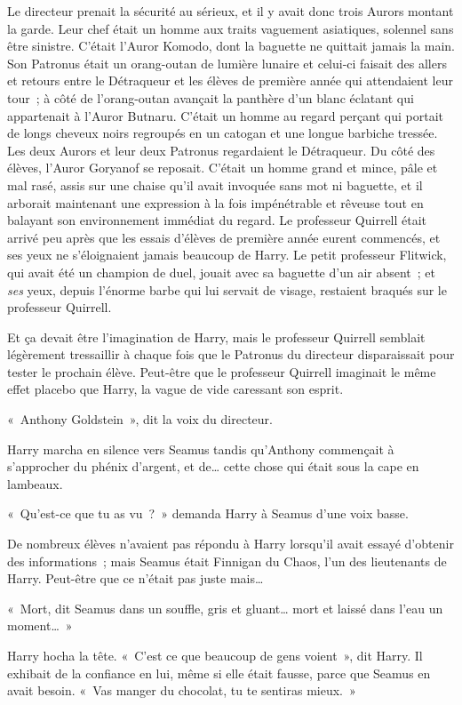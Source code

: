 Le directeur prenait la sécurité au sérieux, et il y avait donc trois Aurors montant la garde. Leur chef était un homme aux traits vaguement asiatiques, solennel sans être sinistre. C'était l'Auror Komodo, dont la baguette ne quittait jamais la main. Son Patronus était un orang-outan de lumière lunaire et celui-ci faisait des allers et retours entre le Détraqueur et les élèves de première année qui attendaient leur tour~; à côté de l'orang-outan avançait la panthère d'un blanc éclatant qui appartenait à l'Auror Butnaru. C'était un homme au regard perçant qui portait de longs cheveux noirs regroupés en un catogan et une longue barbiche tressée. Les deux Aurors et leur deux Patronus regardaient le Détraqueur. Du côté des élèves, l'Auror Goryanof se reposait. C'était un homme grand et mince, pâle et mal rasé, assis sur une chaise qu'il avait invoquée sans mot ni baguette, et il arborait maintenant une expression à la fois impénétrable et rêveuse tout en balayant son environnement immédiat du regard. Le professeur Quirrell était arrivé peu après que les essais d'élèves de première année eurent commencés, et ses yeux ne s'éloignaient jamais beaucoup de Harry. Le petit professeur Flitwick, qui avait été un champion de duel, jouait avec sa baguette d'un air absent~; et \emph{ses} yeux, depuis l'énorme barbe qui lui servait de visage, restaient braqués sur le professeur Quirrell.

Et ça devait être l'imagination de Harry, mais le professeur Quirrell semblait légèrement tressaillir à chaque fois que le Patronus du directeur disparaissait pour tester le prochain élève. Peut-être que le professeur Quirrell imaginait le même effet placebo que Harry, la vague de vide caressant son esprit.

«~Anthony Goldstein~», dit la voix du directeur.

Harry marcha en silence vers Seamus tandis qu'Anthony commençait à s'approcher du phénix d'argent, et de… cette chose qui était sous la cape en lambeaux.

«~Qu'est-ce que tu as vu~?~» demanda Harry à Seamus d'une voix basse.

De nombreux élèves n'avaient pas répondu à Harry lorsqu'il avait essayé d'obtenir des informations~; mais Seamus était Finnigan du Chaos, l'un des lieutenants de Harry. Peut-être que ce n'était pas juste mais…

«~Mort, dit Seamus dans un souffle, gris et gluant… mort et laissé dans l'eau un moment…~»

Harry hocha la tête. «~C'est ce que beaucoup de gens voient~», dit Harry. Il exhibait de la confiance en lui, même si elle était fausse, parce que Seamus en avait besoin. «~Vas manger du chocolat, tu te sentiras mieux.~»

